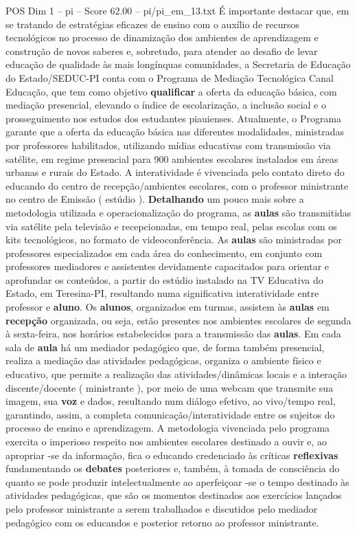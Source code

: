 \begin{textsample}{POS Dim 1 – pi – Score 62.00 – pi/pi\_em\_13.txt}
É importante destacar que, em se tratando de estratégias eficazes de ensino com o auxílio de recursos tecnológicos no processo de dinamização dos ambientes de aprendizagem e construção de novos saberes e, sobretudo, para atender ao desafio de levar educação de qualidade às mais longínquas comunidades, a Secretaria de Educação do Estado/SEDUC-PI conta com o Programa de Mediação Tecnológica Canal Educação, que tem como objetivo \textbf{qualificar} a oferta da educação básica, com mediação presencial, elevando o índice de escolarização, a inclusão social e o prosseguimento nos estudos dos estudantes piauienses.
Atualmente, o Programa garante que a oferta da educação básica nas diferentes modalidades, ministradas por professores habilitados, utilizando mídias educativas com transmissão via satélite, em regime presencial para 900 ambientes escolares instalados em áreas urbanas e rurais do Estado.
A interatividade é vivenciada pelo contato direto do educando do centro de recepção/ambientes escolares, com o professor ministrante no centro de Emissão ( estúdio ). \textbf{Detalhando} um pouco mais sobre a metodologia utilizada e operacionalização do programa, as \textbf{aulas} são transmitidas via satélite pela televisão e recepcionadas, em tempo real, pelas escolas com os kits tecnológicos, no formato de videoconferência.
As \textbf{aulas} são ministradas por professores especializados em cada área do conhecimento, em conjunto com professores mediadores e assistentes devidamente capacitados para orientar e aprofundar os conteúdos, a partir do estúdio instalado na TV Educativa do Estado, em Teresina-PI, resultando numa significativa interatividade entre professor e \textbf{aluno}.
Os \textbf{alunos}, organizados em turmas, assistem às \textbf{aulas} em \textbf{recepção} organizada, ou seja, estão presentes nos ambientes escolares de segunda à sexta-feira, nos horários estabelecidos para a transmissão das \textbf{aulas}.
Em cada sala de \textbf{aula} há um mediador pedagógico que, de forma também presencial, realiza a mediação das atividades pedagógicas, organiza o ambiente físico e educativo, que permite a realização das atividades/dinâmicas locais e a interação discente/docente ( ministrante ), por meio de uma webcam que transmite sua imagem, sua \textbf{voz} e dados, resultando num diálogo efetivo, ao vivo/tempo real, garantindo, assim, a completa comunicação/interatividade entre os sujeitos do processo de ensino e aprendizagem.
A metodologia vivenciada pelo programa exercita o imperioso respeito nos ambientes escolares destinado a ouvir e, ao apropriar -se da informação, fica o educando credenciado às críticas \textbf{reflexivas} fundamentando os \textbf{debates} posteriores e, também, à tomada de consciência do quanto se pode produzir intelectualmente ao aperfeiçoar -se o tempo destinado às atividades pedagógicas, que são os momentos destinados aos exercícios lançados pelo professor ministrante a serem trabalhados e discutidos pelo mediador pedagógico com os educandos e posterior retorno ao professor ministrante.

\end{textsample}
